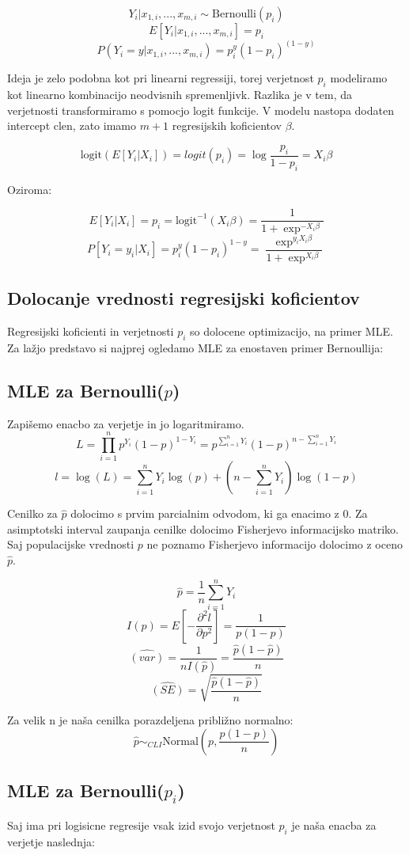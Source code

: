 \documentclass[letterpaper,11pt]{article}
\begin{document}
$$Y_i | x_{1,i},...,x_{m,i}\sim \text{Bernoulli}(p_i)$$
$$E[Y_i | x_{1,i},...,x_{m,i}] = p_i$$
$$P(Y_i = y| x_{1,i},...,x_{m,i}) = p_i^y(1-p_i)^{(1-y)}$$


\noindent Ideja je zelo podobna kot pri linearni regressiji, torej verjetnost $p_i$ modeliramo kot linearno kombinacijo neodvisnih spremenljivk. Razlika je v tem, da verjetnosti transformiramo s pomocjo logit funkcije. V modelu nastopa dodaten intercept clen, zato imamo $m + 1$ regresijskih koficientov $\beta$.

$$\text{logit}(E[Y_i|X_i]) = logit(p_i) = \log{\frac{p_i}{1-p_i}} = X_i \beta$$

\noindent Oziroma:

$$E[Y_i|X_i] = p_i = \text{logit}^{-1}(X_i \beta) = \frac{1}{1+\exp^{-X_i \beta}}$$
$$P[Y_i = y_i|X_i] = p_i^y(1-p_i)^{1-y} = \frac{\exp^{y_i X_i \beta}}{1+\exp^{X_i \beta}}$$


\subsection{Dolocanje vrednosti regresijski koficientov}
Regresijski koficienti in verjetnosti $p_i$ so dolocene optimizacijo, na primer MLE. Za lažjo predstavo si najprej ogledamo MLE za enostaven primer Bernoullija:

\subsection{MLE za Bernoulli($p$)}
Zapišemo enacbo za verjetje in jo logaritmiramo. 
$$L = \prod_{i=1}^n p^{Y_i}(1-p)^{1-Y_i}=p^{\sum_{i=1}^n Y_i}(1-p)^{n-\sum_{i=1}^n Y_i}$$
$$l = \log{(L)} = \sum_{i=1}^n Y_i \log{(p)} + (n-\sum_{i=1}^n Y_i)\log{(1-p)}$$

\noindent Cenilko za $\hat{p}$ dolocimo s prvim parcialnim odvodom, ki ga enacimo z 0. Za asimptotski interval zaupanja cenilke dolocimo Fisherjevo informacijsko matriko. Saj populacijske vrednosti $p$ ne poznamo Fisherjevo informacijo dolocimo z oceno $\hat{p}$.

$$\hat{p}=\frac{1}{n}\sum_{i = 1}^n Y_i$$
$$I(p) = E[-\frac{\partial^2 l}{\partial p^2}]= \frac{1}{p(1-p)}$$
$$\hat{(var)} = \frac{1}{nI(\hat{p})} = \frac{\hat{p}(1-\hat{p})}{n}$$
$$\hat{(SE)} = \sqrt{\frac{\hat{p}(1-\hat{p})}{n}}$$

\noindent Za velik n je naša cenilka porazdeljena približno normalno:
$$\hat{p} \sim_{CLI} \text{Normal}(p, \frac{p(1-p)}{n})$$


\subsection{MLE za Bernoulli($p_i$)}
Saj ima pri logisicne regresije vsak izid svojo verjetnost $p_i$ je naša enacba za verjetje naslednja:
\end{document}
